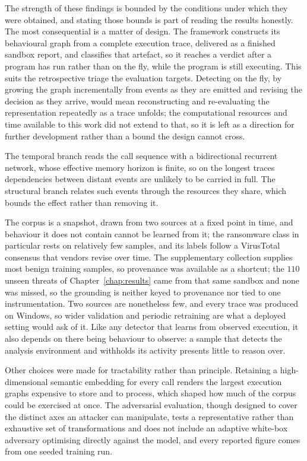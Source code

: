 \documentclass[%
    BCOR=10mm,
    DIV=13,
    toc=bibliography,
    toc=listof,
    oneside,
    12pt,
]{scrbook}
\begin{document}
The strength of these findings is bounded by the conditions under which they were
obtained, and stating those bounds is part of reading the results honestly. The
most consequential is a matter of design. The framework constructs its
behavioural graph from a complete execution trace, delivered as a finished
sandbox report, and classifies that artefact, so it reaches a verdict after a
program has run rather than on the fly, while the program is still executing.
This suits the retrospective triage the evaluation targets. Detecting on the fly,
by growing the graph incrementally from events as they are emitted and revising
the decision as they arrive, would mean reconstructing and re-evaluating the
representation repeatedly as a trace unfolds; the computational resources and
time available to this work did not extend to that, so it is left as a direction
for further development rather than a bound the design cannot cross.

The temporal branch reads the call sequence with a bidirectional recurrent
network, whose effective memory horizon is finite, so on the longest traces
dependencies between distant events are unlikely to be carried in full. The
structural branch relates such events through the resources they share, which
bounds the effect rather than removing it.

The corpus is a snapshot, drawn from two sources at a fixed point in time, and
behaviour it does not contain cannot be learned from it; the ransomware class
in particular rests on relatively few samples, and its labels follow a
VirusTotal consensus that vendors revise over time. The supplementary
collection supplies most benign training samples, so provenance was available
as a shortcut; the $110$ unseen threats of Chapter~\ref{chap:results} came from
that same sandbox and none was missed, so the grounding is neither keyed to
provenance nor tied to one instrumentation. Two sources are nonetheless few,
and every trace was produced on Windows, so wider validation and periodic
retraining are what a deployed setting would ask of it. Like any detector that
learns from observed execution, it also depends on there being behaviour to
observe: a sample that detects the analysis environment and withholds its
activity presents little to reason over.

Other choices were made for tractability rather than principle. Retaining a
high-dimensional semantic embedding for every call renders the largest
execution graphs expensive to store and to process, which shaped how much of
the corpus could be exercised at once. The adversarial evaluation, though
designed to cover the distinct axes an attacker can manipulate, tests a
representative rather than exhaustive set of transformations and does not
include an adaptive white-box adversary optimising directly against the model,
and every reported figure comes from one seeded training run.
\end{document}
